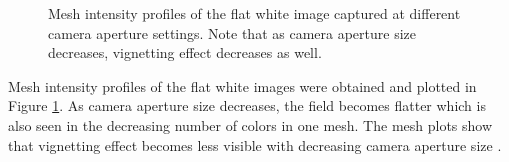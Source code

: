 
\captionsetup[figure]{width=5in}
\begin{figure}[h!]
\caption[Mesh intensity profiles of the flat white image]{Mesh intensity profiles of the flat white image captured at different camera aperture settings. Note that as camera aperture size decreases, vignetting effect decreases as well.}
\label{fig:meshwhite}
\end{figure}

Mesh intensity profiles of the flat white images were obtained and plotted in Figure \ref{fig:meshwhite}. As camera aperture size decreases, the field becomes flatter which is also seen in the decreasing number of colors in one mesh. The mesh plots show that vignetting effect becomes less visible with decreasing camera aperture size \cite{Juang2007}.


